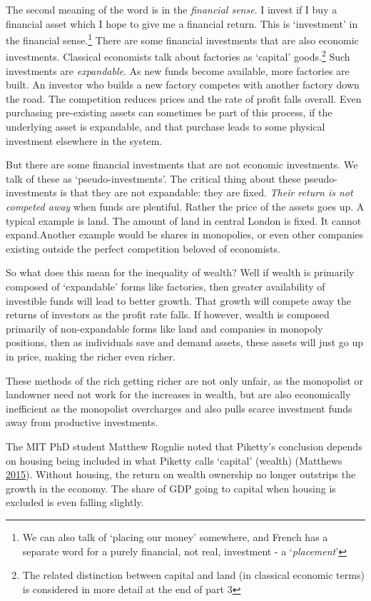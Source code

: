 \documentclass[]{tufte-handout}
\begin{document}
The second meaning of the word is in the \emph{financial sense}. I
invest if I buy a financial asset which I hope to give me a financial
return. This is `investment' in the financial sense.\footnote{We can
  also talk of `placing our money' somewhere, and French has a separate
  word for a purely financial, not real, investment - a
  `\emph{placement}'} There are some financial investments that are also
economic investments. Classical economists talk about factories as
`capital' goods.\footnote{The related distinction between capital and
  land (in classical economic terms) is considered in more detail at the
  end of part 3} Such investments are \emph{expandable}. As new funds
become available, more factories are built. An investor who builds a new
factory competes with another factory down the road. The competition
reduces prices and the rate of profit falls overall. Even purchasing
pre-existing assets can sometimes be part of this process, if the
underlying asset is expandable, and that purchase leads to some physical
investment elsewhere in the system.

But there are some financial investments that are not economic
investments. We talk of these as `pseudo-investments'. The critical
thing about these pseudo-investments is that they are not expandable:
they are fixed. \emph{Their return is not competed away} when funds are
plentiful. Rather the price of the assets goes up. A typical example is
land. The amount of land in central London is fixed. It cannot
expand.Another example would be shares in monopolies, or even other
companies existing outside the perfect competition beloved of
economists.

So what does this mean for the inequality of wealth? Well if wealth is
primarily composed of `expandable' forms like factories, then greater
availability of investible funds will lead to better growth. That growth
will compete away the returns of investors as the profit rate falls. If
however, wealth is composed primarily of non-expandable forms like land
and companies in monopoly positions, then as individuals save and demand
assets, these assets will just go up in price, making the richer even
richer.

These methods of the rich getting richer are not only unfair, as the
monopolist or landowner need not work for the increases in wealth, but
are also economically inefficient as the monopolist overcharges and also
pulls scarce investment funds away from productive investments.

The MIT PhD student Matthew Rognlie noted that Piketty's conclusion
depends on housing being included in what Piketty calls `capital'
(wealth) (Matthews \protect\hyperlink{ref-Matthews}{2015}). Without
housing, the return on wealth ownership no longer outstrips the growth
in the economy. The share of GDP going to capital when housing is
excluded is even falling slightly.
\end{document}
